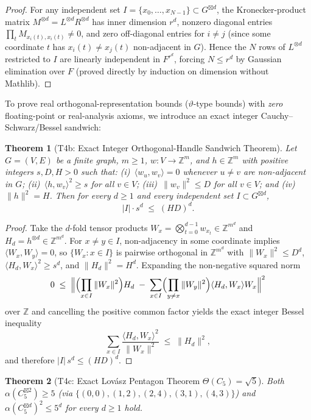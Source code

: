 \documentclass[11pt,reqno]{amsart}
\newtheorem{theorem}{Theorem}[section]
\theoremstyle{definition}
\newcommand{\Z}{\mathbb{Z}}
\newcommand{\sprod}{\boxtimes}
\begin{document}
\begin{proof}
For any independent set $I = \{x_0,\dots,x_{N-1}\} \subset G^{\sprod d}$, the Kronecker-product matrix $M^{\otimes d} = L^{\otimes d} R^{\otimes d}$ has inner dimension $r^d$, nonzero diagonal entries $\prod_t M_{x_i(t),x_i(t)} \neq 0$, and zero off-diagonal entries for $i \neq j$ (since some coordinate $t$ has $x_i(t)\neq x_j(t)$ non-adjacent in $G$). Hence the $N$ rows of $L^{\otimes d}$ restricted to $I$ are linearly independent in $F^{r^d}$, forcing $N \le r^d$ by Gaussian elimination over $F$ (proved directly by induction on dimension without Mathlib).
\end{proof}

To prove real orthogonal-representation bounds ($\vartheta$-type bounds) with \emph{zero} floating-point or real-analysis axioms, we introduce an exact integer Cauchy--Schwarz/Bessel sandwich:

\begin{theorem}[T4b: Exact Integer Orthogonal-Handle Sandwich Theorem]\label{thm:t4b}
Let $G=(V,E)$ be a finite graph, $m \ge 1$, $w : V \to \Z^m$, and $h \in \Z^m$ with positive integers $s, D, H > 0$ such that:
(i)~$\langle w_u, w_v \rangle = 0$ whenever $u \neq v$ are non-adjacent in $G$;
(ii)~$\langle h, w_v \rangle^2 \ge s$ for all $v \in V$;
(iii)~$\|w_v\|^2 \le D$ for all $v \in V$; and
(iv)~$\|h\|^2 = H$.
Then for every $d \ge 1$ and every independent set $I \subset G^{\sprod d}$,
\[
  |I| \cdot s^d \;\le\; (H D)^d.
\]
\end{theorem}

\begin{proof}
Take the $d$-fold tensor products $W_x = \bigotimes_{t=0}^{d-1} w_{x_t} \in \Z^{m^d}$ and $H_d = h^{\otimes d} \in \Z^{m^d}$. For $x \neq y \in I$, non-adjacency in some coordinate implies $\langle W_x, W_y \rangle = 0$, so $\{W_x : x \in I\}$ is pairwise orthogonal in $\Z^{m^d}$ with $\|W_x\|^2 \le D^d$, $\langle H_d, W_x\rangle^2 \ge s^d$, and $\|H_d\|^2 = H^d$. Expanding the non-negative squared norm
\[
  0 \;\le\; \Bigl\| \Bigl(\prod_{x\in I} \|W_x\|^2\Bigr) H_d \;-\; \sum_{x\in I} \Bigl(\prod_{y\neq x} \|W_y\|^2\Bigr) \langle H_d, W_x \rangle W_x \Bigr\|^2
\]
over $\Z$ and cancelling the positive common factor yields the exact integer Bessel inequality
\[
  \sum_{x\in I} \frac{\langle H_d, W_x\rangle^2}{\|W_x\|^2} \;\le\; \|H_d\|^2,
\]
and therefore $|I|\, s^d \le (HD)^d$.
\end{proof}

\begin{theorem}[T4c: Exact Lovász Pentagon Theorem $\Theta(C_5) = \sqrt{5}$]\label{thm:t4c}
Both $\alpha(C_5^{\sprod 2}) \ge 5$ (via $\{(0,0),(1,2),(2,4),(3,1),(4,3)\}$) and $\alpha(C_5^{\sprod d})^2 \le 5^d$ for every $d \ge 1$ hold.
\end{theorem}
\end{document}

